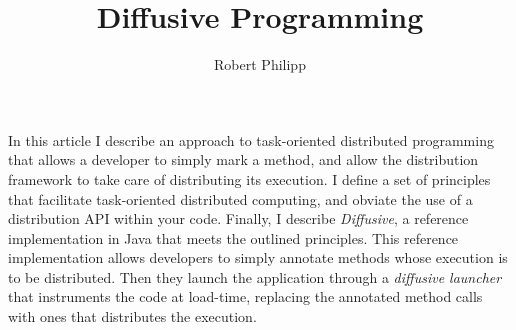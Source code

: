 \documentclass[11pt]{amsart}
\title{Diffusive Programming}
\author{Robert Philipp}
\date{}                                           %
\begin{document}
\maketitle

In this article I describe an approach to task-oriented distributed programming that allows a developer to simply mark a method, and allow the distribution framework to take care of distributing its execution. I define a set of principles that facilitate task-oriented distributed computing, and obviate the use of a distribution API within your code. Finally, I describe \emph{Diffusive}, a reference implementation in Java that meets the outlined principles. This reference implementation allows developers to simply annotate methods whose execution is to be distributed. Then they launch the application through a \emph{diffusive launcher} that instruments the code at load-time, replacing the annotated method calls with ones that distributes the execution.
\end{document}
